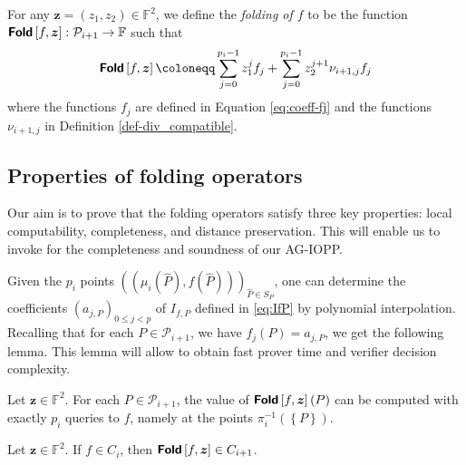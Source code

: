 \documentclass[10pt,a4paper]{article}
\renewcommand\hat{\widehat}
\newcommand\F{\mathbb{F}}
\newcommand\fold[1]{\textsf{\textbf{Fold}}\left[#1\right]}
\renewcommand{\hat}{\widehat}
\renewcommand{\vec}[1]{\boldsymbol{#1}}
\newcommand{\set}[1]{\left\{#1\right\}}
\newcommand\bfz{{\vec{z}}}
\newcommand\calP{\mathcal{P}}
\newcommand\mydef{\coloneqq}
\theoremstyle{plain}
\theoremstyle{plain}
\theoremstyle{definition}
\theoremstyle{remark}
\theoremstyle{plain}
\begin{document}
\begin{definition}\label{def:folding-operator}
	For any $\bfz=(z_1,z_2) \in \F^2$, we define the \emph{folding of $f$} to be the function ${\fold{f, \bfz} : \mathcal P_{i+1} \rightarrow \F}$ such that
	\begin{equation}\label{eq:fold-via-interp}
		\fold{f, \bfz} \mydef\sum_{j=0}^{p_i-1} z_1^j f_j + \sum_{j=0}^{p_i-1} z_2^{j+1} \nu_{i+1,j} f_j
	\end{equation}    
	where the functions $f_j$ are defined in Equation \eqref{eq:coeff-fj} and the functions $\nu_{i+1,j}$ in Definition \ref{def-div_compatible}.
\end{definition}

\subsection{Properties of folding operators}
Our aim is to prove that the folding operators satisfy three key properties: local computability, completeness, and distance preservation. This will enable us to invoke \cite[Theorem~1]{ABN21} for the completeness and soundness of our AG-IOPP.


Given the $p_i$ points $((\mu_i(\hat P), f(\hat P)))_{\hat P \in S_P}$, one can determine the coefficients $(a_{j, P})_{0 \le j < p}$ of $I_{f, P}$ defined in \eqref{eq:IfP} by polynomial interpolation. Recalling that for each $P \in \calP_{i + 1}$, we have ${f_j(P) = a_{j, P}}$, we get the following lemma. This lemma will allow to obtain fast prover time and verifier decision complexity.

\begin{lemma}[Locality]\label{lem:locality}
	Let $\bfz \in \F^2$. For each $P \in \calP_{i+1}$, the value of $\fold{f, \bfz}(P)$ can be computed with exactly $p_i$ queries to $f$, namely at the points $\pi_i^{-1}(\set{P})$.
\end{lemma}

\begin{proposition}[Completeness]\label{prop:folding-completeness}
	Let $\bfz \in \F^2$. If $f \in C_i$, then $\fold{f,\bfz} \in C_{i+1}$.
\end{proposition}
\end{document}
